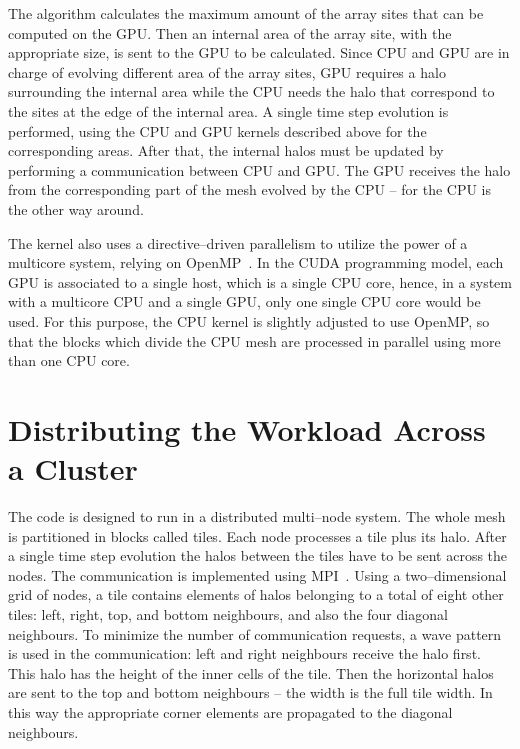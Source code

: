The algorithm calculates the maximum amount of the array sites that can be computed on the GPU. Then an internal area of the array site, with the appropriate size, is sent to the GPU to be calculated. Since CPU and GPU are in charge of evolving different area of the array sites, GPU requires a halo surrounding the internal area while the CPU needs the halo that correspond to the sites at the edge of the internal area. A single time step evolution is performed, using the CPU and GPU kernels described above for the corresponding areas. After that, the internal halos must be updated by performing a communication between CPU and GPU. The GPU receives the halo from the corresponding part of the mesh evolved by the CPU -- for the CPU is the other way around. 

The kernel also uses a directive--driven parallelism to utilize the power of a multicore system, relying on OpenMP~\citep{dagum1998openmp}. In the CUDA programming model, each GPU is associated to a single host, which is a single CPU core, hence, in a system with a multicore CPU and a single GPU, only one single CPU core would be used. For this purpose, the CPU kernel is slightly adjusted to use OpenMP, so that the blocks which divide the CPU mesh are processed in parallel using more than one CPU core.

\section{Distributing the Workload Across a Cluster}
The code is designed to run in a distributed multi--node system. The whole mesh is partitioned in blocks called tiles. Each node processes a tile plus its halo. After a single time step evolution the halos between the tiles have to be sent across the nodes. The communication is implemented using MPI~\citep{snir1998mpi}. Using a two--dimensional grid of nodes, a tile contains elements of halos belonging to a total of eight other tiles: left, right, top, and bottom neighbours, and also the four diagonal neighbours. To minimize the number of communication requests, a wave pattern is used in the communication: left and right neighbours receive the halo first. This halo has the height of the inner cells of the tile. Then the horizontal halos are sent to the top and bottom neighbours – the width is the full tile width. In this way the appropriate corner elements are propagated to the diagonal neighbours.

